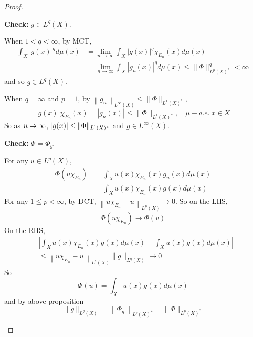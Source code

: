 \begin{proof}
\begin{itemize}
\begin{enumerate}[label=(\roman*)]
			\noindent \textbf{Check:} $g \in L^q(X)$.

			\noindent When $1 < q < \infty$, by MCT,
			\begin{equation*}
				\begin{aligned}
					\int_X|g(x)|^q d \mu(x) & =\lim _{n \rightarrow \infty} \int_X|g(x)|^q \chi_{E_n}(x) d \mu(x) \\
					& =\lim _{n \rightarrow \infty} \int_X\left|g_n(x)\right|^q d \mu(x) \leq\|\Phi\|_{L^p(X)^*}^q<\infty
				\end{aligned}
			\end{equation*}
			and so $g \in L^q(X)$.

			\noindent When $q = \infty$ and $p = 1$, by $\left\|g_n\right\|_{L^{\infty}(X)} \leq\|\Phi\|_{L^1(X)^*}$,
			\begin{equation*}
				|g(x)| \chi_{E_n}(x)=\left|g_n(x)\right| \leq\|\Phi\|_{L^1(X)^*},\quad \mu-a.e.~ x \in X
			\end{equation*}
			So as $n \rightarrow \infty$, $\left\lvert g(x)\right\lvert \leq \|\Phi\|_{L^1(X)^*}$ and $g \in L^\infty(X)$.

			\noindent \textbf{Check:} $\Phi = \Phi_g$.

			\noindent For any $u \in L^p(X)$,
			\begin{equation*}
				\begin{aligned}
					\Phi\left(u \chi_{E_n}\right) & =\int_X u(x) \chi_{E_n}(x) g_n(x) d \mu(x) \\
					& =\int_X u(x) \chi_{E_n}(x) g(x) d \mu(x)
				\end{aligned}
			\end{equation*}
			For any $1 \leq p < \infty$, by DCT, $\left\|u \chi_{E_n}-u\right\|_{L^p(X)} \longrightarrow 0$. So on the LHS,
			\begin{equation*}
				\Phi\left(u \chi_{E_n}\right) \longrightarrow \Phi(u)
			\end{equation*}
			On the RHS,
			\begin{equation*}
				\begin{aligned}
					& \left|\int_X u(x) \chi_{E_n}(x) g(x) d \mu(x)-\int_X u(x) g(x) d \mu(x)\right| \\
					& \leq\left\|u \chi_{E_n}-u\right\|_{L^p(X)}\|g\|_{L^q(X)} \longrightarrow 0
				\end{aligned}
			\end{equation*}
			So
			\begin{equation*}
				\Phi(u)=\int_X u(x) g(x) d \mu(x)
			\end{equation*}
			and by above proposition
			\begin{equation*}
				\|g\|_{L^q(X)}=\left\|\Phi_g\right\|_{L^p(X)^*}=\|\Phi\|_{L^p(X)^*}
			\end{equation*}
		\end{enumerate}
	\end{itemize}
\end{proof}

